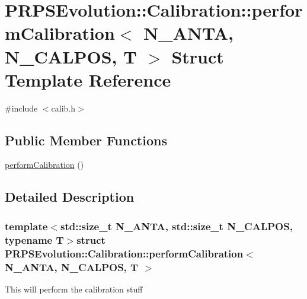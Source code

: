 \hypertarget{struct_p_r_p_s_evolution_1_1_calibration_1_1perform_calibration}{\section{\-P\-R\-P\-S\-Evolution\-:\-:\-Calibration\-:\-:perform\-Calibration$<$ \-N\-\_\-\-A\-N\-T\-A, \-N\-\_\-\-C\-A\-L\-P\-O\-S, \-T $>$ \-Struct \-Template \-Reference}
\label{struct_p_r_p_s_evolution_1_1_calibration_1_1perform_calibration}
}


{\ttfamily \#include $<$calib.\-h$>$}

\subsection*{\-Public \-Member \-Functions}
\begin{DoxyCompactItemize}
\item 
\hyperlink{struct_p_r_p_s_evolution_1_1_calibration_1_1perform_calibration_a837b49f501716adbfda554e04118ce3e}{perform\-Calibration} ()
\end{DoxyCompactItemize}


\subsection{\-Detailed \-Description}
\subsubsection*{template$<$std\-::size\-\_\-t \-N\-\_\-\-A\-N\-T\-A, std\-::size\-\_\-t \-N\-\_\-\-C\-A\-L\-P\-O\-S, typename \-T$>$struct P\-R\-P\-S\-Evolution\-::\-Calibration\-::perform\-Calibration$<$ N\-\_\-\-A\-N\-T\-A, N\-\_\-\-C\-A\-L\-P\-O\-S, T $>$}

\-This will perform the calibration stuff 

